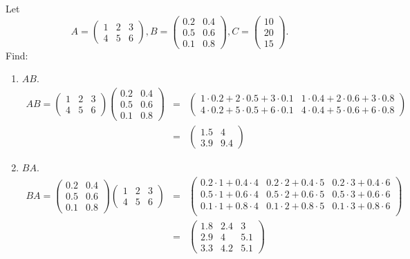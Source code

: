 \begin{example}\label{Example:MoreMatrixProducts}
Let $$A=\begin{pmatrix}
1 & 2 & 3\\ 4 & 5 & 6
\end{pmatrix}, B=\begin{pmatrix}
0.2 & 0.4 \\ 0.5 & 0.6 \\ 0.1 & 0.8
\end{pmatrix}, C=\begin{pmatrix}
10 \\ 20 \\ 15
\end{pmatrix}.$$
Find:

\begin{enumerate}
    \item $AB$.
    \begin{eqnarray*}
    AB=\begin{pmatrix}
1 & 2 & 3\\ 4 & 5 & 6
\end{pmatrix}\begin{pmatrix}
0.2 & 0.4 \\ 0.5 & 0.6 \\ 0.1 & 0.8
\end{pmatrix}&=&\begin{pmatrix}
1\cdot0.2+2\cdot0.5+3\cdot0.1 & 1\cdot0.4+2\cdot0.6+3\cdot0.8\\
4\cdot0.2+5\cdot0.5+6\cdot0.1 & 4\cdot0.4+5\cdot0.6+6\cdot0.8 
\end{pmatrix}\\
&=&\begin{pmatrix}
1.5 & 4 \\ 3.9  &  9.4
\end{pmatrix}
    \end{eqnarray*}
    
    
    
    \item $BA$.
    \begin{eqnarray*}
    BA=\begin{pmatrix}
0.2 & 0.4 \\ 0.5 & 0.6 \\ 0.1 & 0.8
\end{pmatrix}\begin{pmatrix}
1 & 2 & 3\\ 4 & 5 & 6
\end{pmatrix}&=&\begin{pmatrix}
0.2\cdot1+ 0.4\cdot 4 & 0.2\cdot2+ 0.4\cdot 5 & 0.2\cdot3+ 0.4\cdot6\\
0.5\cdot1+ 0.6\cdot 4 & 0.5\cdot2+ 0.6\cdot 5 & 0.5\cdot3+ 0.6\cdot6\\
0.1\cdot1+ 0.8\cdot 4 & 0.1\cdot2+ 0.8\cdot 5 & 0.1\cdot3+ 0.8\cdot6\\
\end{pmatrix}\\
&=&\begin{pmatrix}
1.8 & 2.4 & 3 \\ 2.9  &  4 & 5.1 \\ 3.3 & 4.2 & 5.1
\end{pmatrix}
    \end{eqnarray*}    
    

\end{enumerate}
\end{example}
